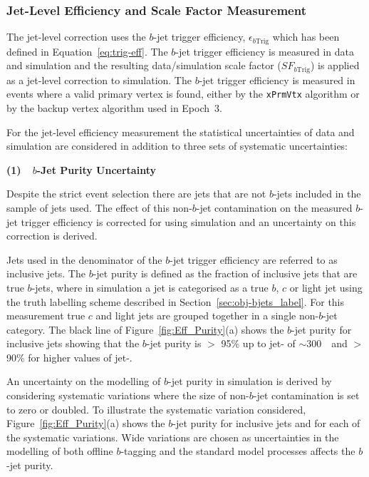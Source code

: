 \subsubsection{Jet-Level Efficiency and Scale Factor Measurement}
\label{sec:trig-jetLevelEff}

The jet-level correction uses the $b$-jet trigger efficiency, $\epsilon_{b\text{Trig}}$
which has been defined in Equation~\ref{eq:trig-eff}.
The $b$-jet trigger efficiency is measured in data and simulation
and the resulting data/simulation scale factor ($SF_{b\text{Trig}}$) is applied as a jet-level correction to simulation.
The $b$-jet trigger efficiency is measured in events where a valid primary vertex is found,
either by the \verb|xPrmVtx| algorithm or by the backup vertex algorithm used in Epoch~3.

For the jet-level efficiency measurement the 
statistical uncertainties of data and simulation are considered in addition
to three sets of systematic uncertainties:

\newpage
\noindent
\textbf{(1)~~$b$-Jet Purity Uncertainty} 

Despite the strict event selection there are
jets that are not $b$-jets included in the sample of jets used.
The effect of this non-$b$-jet contamination on the measured $b$-jet trigger efficiency
is corrected for using simulation and an uncertainty on this correction is derived.

Jets used in the denominator of the $b$-jet trigger efficiency are referred to as inclusive jets.
The $b$-jet purity is defined as the fraction of inclusive jets that are true $b$-jets,
where in simulation a jet is categorised as a true $b$,  $c$ or light jet using 
the truth labelling scheme described in Section~\ref{sec:obj-bjets_label}.
For this measurement true $c$ and light jets are grouped together in a single non-$b$-jet category.
The black line of Figure~\ref{fig:Eff_Purity}(a) shows the $b$-jet purity for inclusive jets showing that 
the $b$-jet purity is $>$ 95\% up to jet-\pT{} of $\sim$300~\GeV~and $>$ 90\% for higher values of jet-\pT.

An uncertainty on the modelling of $b$-jet purity in simulation is derived by considering systematic variations where the
size of non-$b$-jet contamination is set to zero or doubled.
To illustrate the systematic variation considered, Figure~\ref{fig:Eff_Purity}(a) shows the $b$-jet purity for inclusive jets and for each of the systematic variations.
Wide variations are chosen as uncertainties in the modelling of both offline $b$-tagging and the standard model processes affects the $b$-jet purity.

